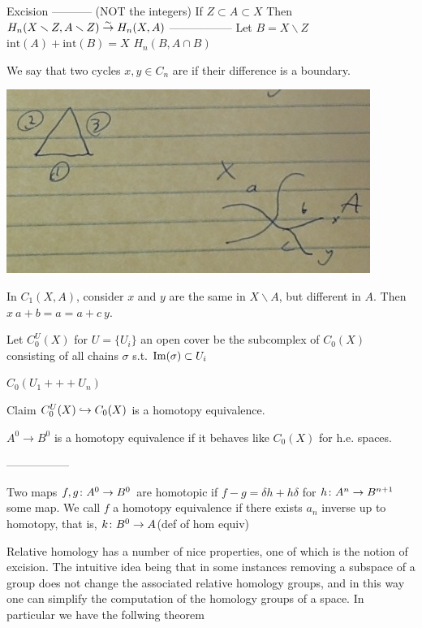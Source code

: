 \documentclass[11pt,leqno,oneside]{amsart}
\newenvironment{dateenv}{
  \vspace{1em}
}{
  \vspace{1em}
}
\newcommand{\mydate}[4]{
  \newdate{#1}{#2}{#3}{#4}
  \begin{dateenv}
    \hfill\displaydate{#1}
  \end{dateenv}
}
\numberwithin{thm}{section}
\newcommand{\minus}{\smallsetminus}
\begin{document}
Excision
-----------
(NOT the integers)
If $Z \subset A \subset X$
Then $H_n(X \minus Z, A \minus Z) \isomto H_n(X, A)$
-----------------
Let $B = X \minus Z$
$\text{int}(A) + \text{int}(B) = X$
$H_n(B, A \cap B)$

\begin{defn}
  We say that two cycles $x, y \in C_n$ are  if their difference is a boundary.
\end{defn}
\begin{example}
  \includegraphics[scale=0.4]{images/homologous}

  In $C_1(X,A)$, consider $x$ and $y$ are the same in $X \minus A$, but different in $A$.  Then $x ~ a+b = a  = a+c ~ y$.
\end{example}

Let $C^U_0(X)$ for $U = \{U_i\}$ an open cover be the subcomplex of $C_0(X)$ consisting of all chains $\sigma$ s.t. $\operatorname{Im}(\sigma) \subset U_i$

$C_0(U_1 +++ U_n)$

Claim $C^U_0(X) \hookrightarrow C_0(X)$ is a homotopy equivalence.

$A^0 \to B^0$ is a homotopy equivalence if it behaves like $C_0(X)$ for h.e. spaces.

-----------------

Two maps $f,g \colon A^0 \to B^0$ are homotopic if $f - g = \delta h + h \delta$ for $h \colon A^n \to B^{n+1}$ some map.  We call $f$ a homotopy equivalence if there exists $a_n$ inverse up to homotopy, that is, $k \colon B^0 \to A$(def of hom equiv)




\mydate{d21}{22}{3}{2017}

Relative homology has a number of nice properties, one of which is the notion of excision. The intuitive idea being that in some instances removing a subspace of a group does not change the associated relative homology groups, and in this way one can simplify the computation of the homology groups of a space. In particular we have the follwing theorem
\end{document}
